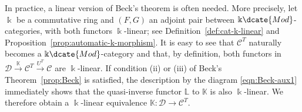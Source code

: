 In practice, a linear version of Beck's theorem is often needed. More
precisely, let $\Bbbk$ be a commutative ring and $(F,G)$ an adjoint pair
between $\Bbbk\dcate{Mod}$-categories, with both functors $\Bbbk$-linear;
see Definition~\ref{def:cat-k-linear} and
Proposition~\ref{prop:automatic-k-morphism}. It is easy to see that
$\mathcal{C}^T$ naturally becomes a $\Bbbk\dcate{Mod}$-category and that,
by definition, both functors in
$\mathcal{D}\xrightarrow{\mathbb{K}}\mathcal{C}^T\xrightarrow{U^T}\mathcal{C}$
are $\Bbbk$-linear. If condition (ii) or (iii) of Beck's
Theorem~\ref{prop:Beck} is satisfied, the description by the diagram
\eqref{eqn:Beck-aux1} immediately shows that the quasi-inverse functor
$\mathbb{L}$ to $\mathbb{K}$ is also $\Bbbk$-linear. We therefore obtain a
$\Bbbk$-linear equivalence $\mathbb{K}:\mathcal{D}\to\mathcal{C}^T$.
